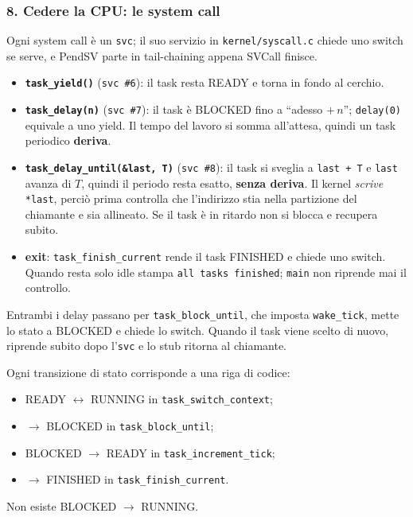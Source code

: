 \subsubsection*{8. Cedere la CPU: le system call}
Ogni system call è un \texttt{svc}; il suo servizio in \texttt{kernel/syscall.c} chiede uno switch se serve, e PendSV parte in tail-chaining appena SVCall finisce.
\begin{itemize}
    \item \textbf{\texttt{task\_yield()}} (\texttt{svc \#6}): il task resta READY e torna in fondo al cerchio.
    \item \textbf{\texttt{task\_delay(n)}} (\texttt{svc \#7}): il task è BLOCKED fino a ``adesso $+\,n$''; \texttt{delay(0)} equivale a uno yield. Il tempo del lavoro si somma all'attesa, quindi un task periodico \textbf{deriva}.
    \item \textbf{\texttt{task\_delay\_until(\&last, T)}} (\texttt{svc \#8}): il task si sveglia a \texttt{last + T} e \texttt{last} avanza di $T$, quindi il periodo resta esatto, \textbf{senza deriva}. Il kernel \emph{scrive} \texttt{*last}, perciò prima controlla che l'indirizzo stia nella partizione del chiamante e sia allineato. Se il task è in ritardo non si blocca e recupera subito.
    \item \textbf{exit}: \texttt{task\_finish\_current} rende il task FINISHED e chiede uno switch. Quando resta solo idle stampa \texttt{all tasks finished}; \texttt{main} non riprende mai il controllo.
\end{itemize}
Entrambi i delay passano per \texttt{task\_block\_until}, che imposta \texttt{wake\_tick}, mette lo stato a BLOCKED e chiede lo switch. Quando il task viene scelto di nuovo, riprende subito dopo l'\texttt{svc} e lo stub ritorna al chiamante.

Ogni transizione di stato corrisponde a una riga di codice:
\begin{itemize}
    \item READY $\leftrightarrow$ RUNNING in \texttt{task\_switch\_context};
    \item $\to$ BLOCKED in \texttt{task\_block\_until};
    \item BLOCKED $\to$ READY in \texttt{task\_increment\_tick};
    \item $\to$ FINISHED in \texttt{task\_finish\_current}.
\end{itemize}
Non esiste BLOCKED $\to$ RUNNING.

